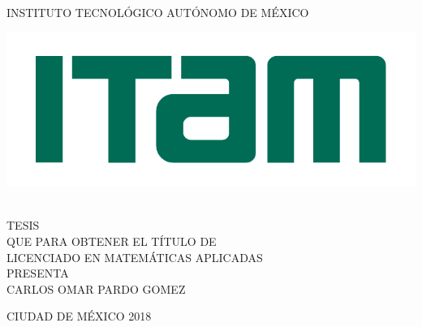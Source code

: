 \begin{titlepage}
\begin{center}

\large{INSTITUTO TECNOL\'OGICO AUT\'ONOMO DE M\'EXICO}\\[2em]
\hline

\begin{center}
	\includegraphics{Figures/Miscellaneous/logo-ITAM.pdf}
\end{center}

\vspace{1em}

{}\\[3em]

\textsc{\large TESIS}\\[1em]

\textsc{\normalsize QUE PARA OBTENER EL T\'ITULO DE}\\[1em]

\textsc{\normalsize LICENCIADO EN MATEM\'ATICAS APLICADAS}\\[1em]

\textsc{\normalsize PRESENTA}\\[1em]

\textsc{\Large CARLOS OMAR PARDO GOMEZ}\\[3em]

\end{center}

\vspace*{\fill}
\textsc{CIUDAD DE M\'EXICO \hspace*{\fill} 2018}

\end{titlepage}